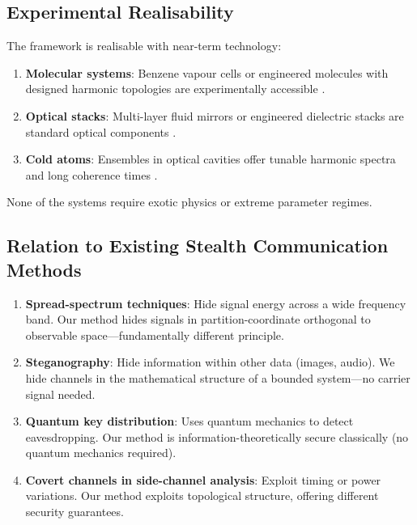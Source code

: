 \documentclass[11pt,twocolumn,a4paper]{article}
\theoremstyle{definition}
\begin{document}
\subsection{Experimental Realisability}

The framework is realisable with near-term technology:

\begin{enumerate}[nosep]
\item \textbf{Molecular systems}: Benzene vapour cells or engineered molecules with designed harmonic topologies are experimentally accessible \cite{Herzberg1945}.

\item \textbf{Optical stacks}: Multi-layer fluid mirrors or engineered dielectric stacks are standard optical components \cite{BornWolf1999}.

\item \textbf{Cold atoms}: Ensembles in optical cavities offer tunable harmonic spectra and long coherence times \cite{Stenholm1986}.
\end{enumerate}

None of the systems require exotic physics or extreme parameter regimes.

\subsection{Relation to Existing Stealth Communication Methods}

\begin{enumerate}[nosep]
\item \textbf{Spread-spectrum techniques}: Hide signal energy across a wide frequency band. Our method hides signals in partition-coordinate orthogonal to observable space—fundamentally different principle.

\item \textbf{Steganography}: Hide information within other data (images, audio). We hide channels in the mathematical structure of a bounded system—no carrier signal needed.

\item \textbf{Quantum key distribution}: Uses quantum mechanics to detect eavesdropping. Our method is information-theoretically secure classically (no quantum mechanics required).

\item \textbf{Covert channels in side-channel analysis}: Exploit timing or power variations. Our method exploits topological structure, offering different security guarantees.
\end{enumerate}
\end{document}
